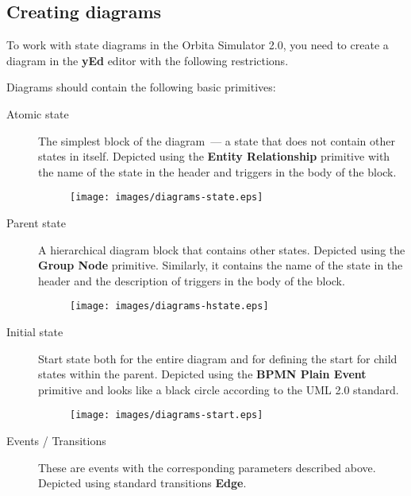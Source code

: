 \documentclass[12pt,a4paper]{article}
\begin{document}
\subsection*{Creating diagrams}

To work with state diagrams in the Orbita Simulator 2.0, you need to create a diagram in the \textbf{yEd} editor with the following restrictions.

Diagrams should contain the following basic primitives:

\begin{description}
\item[Atomic state] The simplest block of the diagram~--- a state that does not contain
   other states in itself. Depicted using  the \textbf{Entity Relationship}
  primitive with the name of the state in the header and triggers in the body of the block.

\begin{figure}[h]
  \begin{center}
    \texttt{[image: images/diagrams-state.eps]}
  \end{center}
\end{figure}

\item[Parent state] A hierarchical diagram block that contains other states. Depicted using the \textbf{Group Node} primitive. Similarly, it contains the name of the state in the header and the description of triggers in the body of the block.

\begin{figure}[h]
  \begin{center}
    \texttt{[image: images/diagrams-hstate.eps]}
  \end{center}
\end{figure}

\item[Initial state] Start state both for the entire diagram and for defining the start for child states within the parent. Depicted using the \textbf{BPMN Plain Event} primitive and looks like a black circle according to the UML 2.0 standard.

\begin{figure}[h]
  \begin{center}
    \texttt{[image: images/diagrams-start.eps]}
  \end{center}
\end{figure}

\item[Events / Transitions] These are events with the corresponding parameters described above. Depicted using standard transitions \textbf{Edge}.


\end{description}
\end{document}
